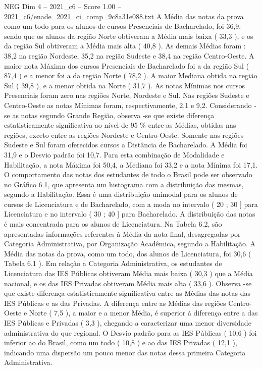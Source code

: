 \begin{textsample}{NEG Dim 4 – 2021\_c6 – Score 1.00 – 2021\_c6/enade\_2021\_ci\_comp\_9c8a31e088.txt}
A Média das notas da prova como um todo para os alunos de cursos Presenciais de Bacharelado, foi 36,9, sendo que os alunos da região Norte obtiveram a Média mais baixa ( 33,3 ), e os da região Sul obtiveram a Média mais alta ( 40,8 ).
As demais Médias foram : 38,2 na região Nordeste, 35,2 na região Sudeste e 38,4 na região Centro-Oeste.
A maior nota Máxima dos cursos Presenciais de Bacharelado foi a da região Sul ( 87,4 ) e a menor foi a da região Norte ( 78,2 ).
A maior Mediana obtida na região Sul ( 39,8 ), e a menor obtida na Norte ( 31,7 ).
As notas Mínimas nos cursos Presenciais foram zero nas regiões Norte, Nordeste e Sul.
Nas regiões Sudeste e Centro-Oeste as notas Mínimas foram, respectivamente, 2,1 e 9,2.
Considerando -se as notas segundo Grande Região, observa -se que existe diferença estatisticamente significativa ao nível de 95 \% entre as Médias, obtidas nas regiões, exceto entre as regiões Nordeste e Centro-Oeste.
Somente nas regiões Sudeste e Sul foram oferecidos cursos a Distância de Bacharelado.
A Média foi 31,9 e o Desvio padrão foi 10,7.
Para esta combinação de Modalidade e Habilitação, a nota Máxima foi 50,4, a Mediana foi 33,2 e a nota Mínima foi 17,1.
O comportamento das notas dos estudantes de todo o Brasil pode ser observado no Gráfico 6.1, que apresenta um histograma com a distribuição das mesmas, segundo a Habilitação.
Essa é uma distribuição unimodal para os alunos de cursos de Licenciatura e de Bacharelado, com a moda no intervalo ( 20 ; 30 ] para Licenciatura e no intervalo ( 30 ; 40 ] para Bacharelado.
A distribuição das notas é mais concentrada para os alunos de Licenciatura.
Na Tabela 6.2, são apresentadas informações referentes à Média da nota final, desagregadas por Categoria Administrativa, por Organização Acadêmica, segundo a Habilitação.
A Média das notas da prova, como um todo, dos alunos de Licenciatura, foi 30,6 ( Tabela 6.1 ).
Em relação a Categoria Administrativa, os estudantes de Licenciatura das IES Públicas obtiveram Média mais baixa ( 30,3 ) que a Média nacional, e os das IES Privadas obtiveram Média mais alta ( 33,6 ).
Observa -se que existe diferença estatisticamente significativa entre as Médias das notas das IES Públicas e as das Privadas.
A diferença entre as Médias das regiões Centro-Oeste e Norte ( 7,5 ), a maior e a menor Média, é superior à diferença entre a das IES Públicas e Privadas ( 3,3 ), chegando a caracterizar uma menor diversidade administrativa do que regional.
O Desvio padrão para as IES Públicas ( 10,6 ) foi inferior ao do Brasil, como um todo ( 10,8 ) e ao das IES Privadas ( 12,1 ), indicando uma dispersão um pouco menor das notas dessa primeira Categoria Administrativa.

\end{textsample}
